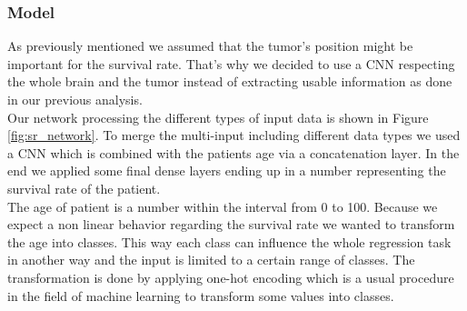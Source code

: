 \documentclass[a4paper,12pt,pagesize,headsepline,bibtotoc,titlepage]{scrartcl}
\begin{document}
\subsubsection{Model}

As previously mentioned we assumed that the tumor's position might be important for the survival rate.
That's why we decided to use a CNN respecting the whole brain and the tumor instead of extracting usable information as done in our previous analysis. \\
Our network processing the different types of input data is shown in Figure \ref{fig:sr_network}.
To merge the multi-input including different data types we used a CNN which is combined with the patients age via a concatenation layer.
In the end we applied some final dense layers ending up in a number representing the survival rate of the patient. \\

The age of patient is a number within the interval from 0 to 100.
Because we expect a non linear behavior regarding the survival rate we wanted to transform the age into classes.
This way each class can influence the whole regression task in another way and the input is limited to a certain range of classes.
The transformation is done by applying one-hot encoding which is a usual procedure in the field of machine learning to transform some values into classes.
\end{document}
